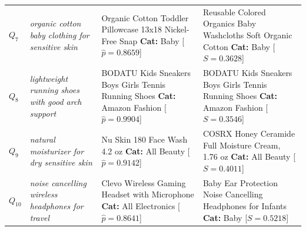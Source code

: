 \documentclass[11pt]{article}
\begin{document}
\begin{longtable}{p{0.6cm} p{3.1cm} p{5.6cm} p{5.6cm}}
  \addlinespace
  $Q_7$ & \textit{organic cotton baby clothing for sensitive skin}
        & Organic Cotton Toddler Pillowcase 13x18 Nickel-Free Snap \newline \textbf{Cat:} Baby \hfill [$\hat{p} = 0.8659$]
        & Reusable Colored Organics Baby Washcloths Soft Organic Cotton \newline \textbf{Cat:} Baby \hfill [$S = 0.3628$] \\
  \addlinespace
  $Q_8$ & \textit{lightweight running shoes with good arch support}
        & BODATU Kids Sneakers Boys Girls Tennis Running Shoes \newline \textbf{Cat:} Amazon Fashion \hfill [$\hat{p} = 0.9904$]
        & BODATU Kids Sneakers Boys Girls Tennis Running Shoes \newline \textbf{Cat:} Amazon Fashion \hfill [$S = 0.3546$] \\
  \addlinespace
  $Q_9$ & \textit{natural moisturizer for dry sensitive skin}
        & Nu Skin 180 Face Wash 4.2 oz \newline \textbf{Cat:} All Beauty \hfill [$\hat{p} = 0.9142$]
        & COSRX Honey Ceramide Full Moisture Cream, 1.76 oz \newline \textbf{Cat:} All Beauty \hfill [$S = 0.4011$] \\
  \addlinespace
  $Q_{10}$ & \textit{noise cancelling wireless headphones for travel}
        & Clevo Wireless Gaming Headset with Microphone \newline \textbf{Cat:} All Electronics \hfill [$\hat{p} = 0.8641$]
        & Baby Ear Protection Noise Cancelling Headphones for Infants \newline \textbf{Cat:} Baby \hfill [$S = 0.5218$] \\
\end{longtable}
\clearpage
\end{document}
